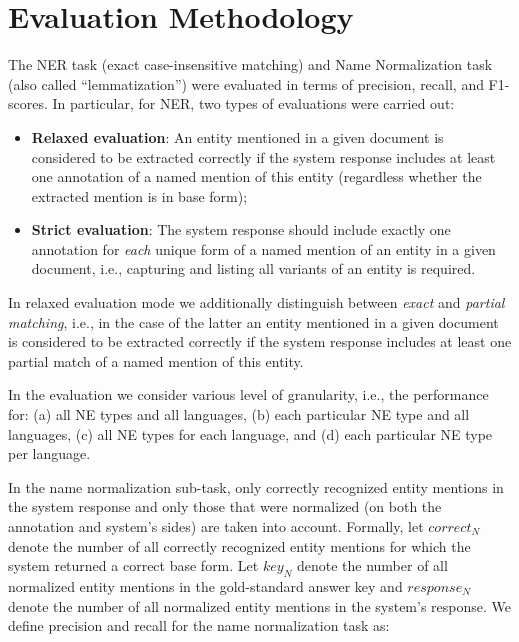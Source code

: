 \documentclass[11pt]{article}
\begin{document}
\begin{table*}[t]
\begin{minipage}{\linewidth}
  \end{minipage}%
\end{table*}



\section{Evaluation Methodology}
\label{sec:evaluation}

The NER task (exact case-insensitive matching) and Name Normalization task (also called
``lemmatization'') were evaluated in terms of precision, recall, and F1-scores.  In
particular, for NER, two types of evaluations were carried out:

\begin{itemize}

\item \textbf{Relaxed evaluation}: An entity mentioned in a given document is considered to be
  extracted correctly if the system response includes at least one annotation of a named
  mention of this entity (regardless whether the extracted mention is in base form);

\item \textbf{Strict evaluation}: The system response should include exactly one annotation
  for {\em each} unique form of a named mention of an entity in a given document, i.e.,
  capturing and listing all variants of an entity is required.

\end{itemize}

\noindent In relaxed evaluation mode we additionally distinguish between \textit{exact} and
\textit{partial matching}, i.e., in the case of the latter an entity mentioned in a given
document is considered to be extracted correctly if the system response includes at least one
partial match of a named mention of this entity.

In the evaluation we consider various level of granularity, i.e., the performance for: (a) all
NE types and all languages, (b) each particular NE type and all languages, (c) all NE types
for each language, and (d) each particular NE type per language.


In the name normalization sub-task, only correctly recognized entity mentions in the system
response and only those that were normalized (on both the annotation and system's sides) are
taken into account.  Formally, let $correct_{N}$ denote the number of all correctly recognized
entity mentions for which the system returned a correct base form.  Let $key_{N}$ denote the
number of all normalized entity mentions in the gold-standard answer key and $response_{N}$
denote the number of all normalized entity mentions in the system's response. We define
precision and recall for the name normalization task as:
\end{document}
